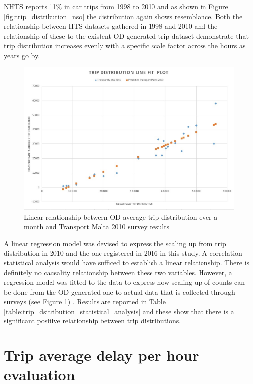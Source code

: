 \documentclass[12pt, a4paper]{report}
\theoremstyle{definition}
\theoremstyle{definition}%
\theoremstyle{definition}%
\theoremstyle{definition}%
\theoremstyle{definition}%
\theoremstyle{definition}%
\begin{document}
NHTS \cite{malta2011national} reports 11\% in car trips from 1998 to 2010 and as shown in Figure \ref{fig:trip_distribution_nso} the distribution again shows resemblance. Both the relationship between HTS datasets gathered in 1998 and 2010 and the relationship of these to the existent OD generated trip dataset demonstrate that trip distribution increases evenly with a specific scale factor across the hours as years go by.


\begin{figure}[!]	
	\includegraphics[scale=0.6]{Trip_distribution_line_fit_plot.jpg}
	\centering
	\caption[NHTS and OD average trip distribution linear relationship]{Linear relationship between OD average trip distribution over a month and Transport Malta 2010 survey results \cite{malta2011national}}
	\label{fig:trip_count_correlation_model}
\end{figure}

A linear regression model was devised to express the scaling up from trip distribution in 2010 and the one registered in 2016 in this study. A correlation statistical analysis would have sufficed to establish a linear relationship. There is definitely no causality relationship between these two variables. However, a regression model was fitted to the data to express how scaling up of counts can be done from the OD generated one to actual data that is collected through surveys (see Figure \ref{fig:trip_count_correlation_model}) . Results are reported in Table \ref{table:trip_dsitribution_statistical_analysis} and these show that there is a significant positive relationship between trip distributions.


\section{Trip average delay per hour evaluation} \label{section:trip_average_delay_evaluation}
\end{document}
